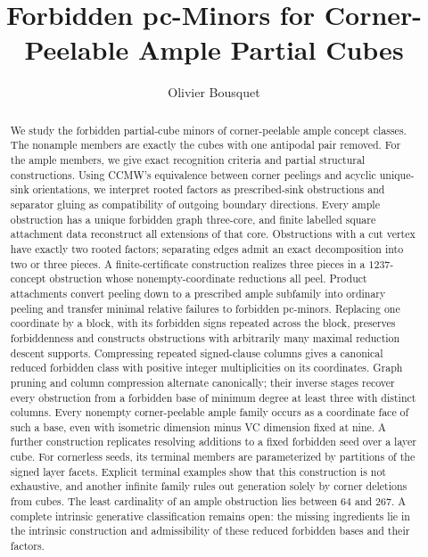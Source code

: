 \documentclass[11pt]{article}
\title{Forbidden pc-Minors for Corner-Peelable Ample Partial Cubes}
\author{Olivier Bousquet}
\date{}
\numberwithin{equation}{section}
\theoremstyle{definition}
\theoremstyle{remark}
\begin{document}
\maketitle

\begin{abstract}
We study the forbidden partial-cube minors of corner-peelable ample
concept classes.  The nonample members are exactly the cubes with one
antipodal pair removed.  For the ample members, we give exact recognition
criteria and partial structural constructions. Using CCMW's equivalence
between corner peelings and acyclic unique-sink orientations, we interpret
rooted factors as prescribed-sink obstructions and separator gluing as
compatibility of outgoing boundary directions. Every ample obstruction
has a unique forbidden graph three-core, and finite labelled square
attachment data reconstruct all extensions of that core.  Obstructions
with a cut vertex have exactly two rooted factors; separating edges
admit an exact decomposition into two or three pieces. A finite-certificate
construction realizes three pieces in a $1237$-concept obstruction whose
nonempty-coordinate reductions all peel. Product attachments
convert peeling down to a prescribed ample subfamily into ordinary peeling
and transfer minimal relative failures to forbidden pc-minors. Replacing one
coordinate by a block, with its forbidden signs repeated across the block,
preserves forbiddenness and constructs obstructions with arbitrarily many
maximal reduction descent supports.  Compressing repeated signed-clause
columns gives a canonical reduced forbidden class with positive integer
multiplicities on its coordinates.  Graph pruning and column compression
alternate canonically; their inverse stages recover every obstruction from
a forbidden base of minimum degree at least three with distinct columns.
Every nonempty corner-peelable ample family occurs as a coordinate face of such a
base, even with isometric dimension minus VC dimension fixed at nine.
A further
construction replicates resolving additions to a fixed forbidden seed
over a layer cube.  For cornerless seeds, its terminal members are
parameterized by partitions of the signed layer facets.  Explicit
terminal examples show that this construction is not exhaustive, and
another infinite family rules out generation solely by corner deletions
from cubes.  The least cardinality of an ample obstruction lies between
\(64\) and \(267\).  A complete intrinsic generative classification
remains open: the missing ingredients lie in the intrinsic construction
and admissibility of these reduced forbidden bases and their factors.
\end{abstract}
\end{document}
